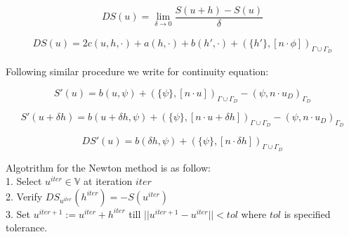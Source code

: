 \documentclass[a4paper,openany]{book}
\begin{document}
\begin{flushleft}
\begin{equation}
DS(u) = \lim_{\delta \to 0} \frac{S(u+h)-S(u)}{\delta}
\end{equation}
\end{flushleft}

\begin{flushleft}
\begin{equation}
\begin{split}
DS(u) = 2 c(u,h,\cdot) + a(h,\cdot) + b(h',\cdot) + (\{h'\},[n\cdot \phi])_{\Gamma \cup \Gamma_D}
\end{split}
\end{equation}
\end{flushleft}

Following similar procedure we write for continuity equation:\\
\begin{flushleft}
\begin{equation}
S'(u) = b(u,\psi) + (\{\psi\},[n \cdot u])_{\Gamma \cup \Gamma_D} - (\psi,n \cdot u_D)_{\Gamma_D}
\end{equation}
\end{flushleft}

\begin{flushleft}
\begin{equation}
S'(u+\delta h) = b(u + \delta h,\psi) + (\{\psi\},[n \cdot u + \delta h])_{\Gamma \cup \Gamma_D} - (\psi,n \cdot u_D)_{\Gamma_D}
\end{equation}
\end{flushleft}

\begin{flushleft}
\begin{equation}
DS'(u) = b(\delta h,\psi) + (\{\psi\},[n \cdot \delta h])_{\Gamma \cup \Gamma_D} 
\end{equation}
\end{flushleft}


Algotrithm for the Newton method is as follow:\\

1. Select $u^{iter} \in \mathbb{V}$ at iteration $iter$\\

2. Verify $DS_{u^{iter}}(h^{iter}) = -S(u^{iter})$\\

3. Set $u^{iter + 1} := u^{iter} + h^{iter}$ till $||u^{iter+1} - u^{iter}|| < tol$ where $tol$ is specified tolerance.\\
\end{document}

